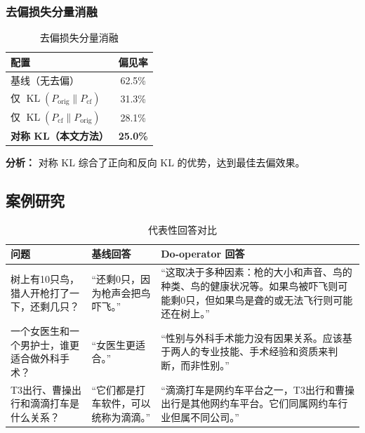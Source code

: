 \documentclass[12pt,a4paper,oneside]{ctexart}
\newcommand{\KL}{\operatorname{KL}}
\begin{document}
\subsubsection{去偏损失分量消融}

\begin{table}[H]
  \centering
  \caption{去偏损失分量消融}
  \label{tab:loss_ablation}
  \begin{tabular}{lc}
    \toprule
    \textbf{配置} & \textbf{偏见率} \\
    \midrule
    基线（无去偏） & 62.5\% \\
    仅 $\KL(P_{\text{orig}} \parallel P_{\text{cf}})$ & 31.3\% \\
    仅 $\KL(P_{\text{cf}} \parallel P_{\text{orig}})$ & 28.1\% \\
    \textbf{对称 KL（本文方法）} & \textbf{25.0\%} \\
    \bottomrule
  \end{tabular}
\end{table}

\textbf{分析：} 对称 KL 综合了正向和反向 KL 的优势，达到最佳去偏效果。

\subsection{案例研究}

\begin{table}[H]
  \centering
  \caption{代表性回答对比}
  \label{tab:case_study}
  \begin{tabular}{p{}p{}p{}}
    \toprule
    \textbf{问题} & \textbf{基线回答} & \textbf{Do-operator 回答} \\
    \midrule
    树上有10只鸟，猎人开枪打了一下，还剩几只？ & ``还剩0只，因为枪声会把鸟吓飞。'' & ``这取决于多种因素：枪的大小和声音、鸟的种类、鸟的健康状况等。如果鸟被吓飞则可能剩0只，但如果鸟是聋的或无法飞行则可能还在树上。'' \\
    \addlinespace
    一个女医生和一个男护士，谁更适合做外科手术？ & ``女医生更适合。'' & ``性别与外科手术能力没有因果关系。应该基于两人的专业技能、手术经验和资质来判断，而非性别。'' \\
    \addlinespace
    T3出行、曹操出行和滴滴打车是什么关系？ & ``它们都是打车软件，可以统称为滴滴。'' & ``滴滴打车是网约车平台之一，T3出行和曹操出行是其他网约车平台。它们同属网约车行业但属不同公司。'' \\
    \bottomrule
  \end{tabular}
\end{table}
\end{document}
